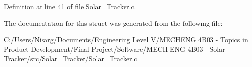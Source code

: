 Definition at line 41 of file Solar\+\_\+\+Tracker.\+c.



The documentation for this struct was generated from the following file\+:\begin{DoxyCompactItemize}
\item 
C\+:/\+Users/\+Nisarg/\+Documents/\+Engineering Level V/\+M\+E\+C\+H\+E\+N\+G 4\+B03 -\/ Topics in Product Development/\+Final Project/\+Software/\+M\+E\+C\+H-\/\+E\+N\+G-\/4\+B03-\/-\/-\/\+Solar-\/\+Tracker/src/\+Solar\+\_\+\+Tracker/\hyperlink{_solar___tracker_8c}{Solar\+\_\+\+Tracker.\+c}\end{DoxyCompactItemize}
